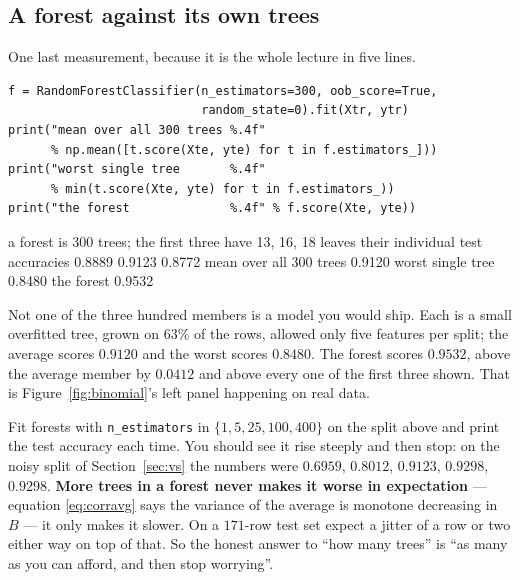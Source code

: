 \documentclass[11pt]{article}
\begin{document}
\subsection{A forest against its own trees}

One last measurement, because it is the whole lecture in five lines.

\begin{lstlisting}
f = RandomForestClassifier(n_estimators=300, oob_score=True,
                           random_state=0).fit(Xtr, ytr)
print("mean over all 300 trees %.4f"
      % np.mean([t.score(Xte, yte) for t in f.estimators_]))
print("worst single tree       %.4f"
      % min(t.score(Xte, yte) for t in f.estimators_))
print("the forest              %.4f" % f.score(Xte, yte))
\end{lstlisting}
\begin{codeout}
a forest is 300 trees; the first three have 13, 16, 18 leaves
their individual test accuracies 0.8889 0.9123 0.8772
mean over all 300 trees          0.9120
worst single tree                0.8480
the forest                       0.9532
\end{codeout}

Not one of the three hundred members is a model you would ship. Each is a
small overfitted tree, grown on $63\%$ of the rows, allowed only five features
per split; the average scores $0.9120$ and the worst scores $0.8480$. The
forest scores $0.9532$, above the average member by $0.0412$ and above every
one of the first three shown. That is Figure~\ref{fig:binomial}'s left panel
happening on real data.

\begin{tryit}
Fit forests with \texttt{n\_estimators} in $\{1, 5, 25, 100, 400\}$ on the
split above and print the test accuracy each time. You should see it rise
steeply and then stop: on the noisy split of Section~\ref{sec:vs} the numbers
were $0.6959$, $0.8012$, $0.9123$, $0.9298$, $0.9298$. \textbf{More trees in a
forest never makes it worse in expectation} --- equation \eqref{eq:corravg}
says the variance of the average is monotone decreasing in $B$ --- it only
makes it slower. On a $171$-row test set expect a jitter of a row or two
either way on top of that. So the honest answer
to ``how many trees'' is ``as many as you can afford, and then stop worrying''.
\end{tryit}

\notesources{\AMLUnitVISources}

\end{document}
